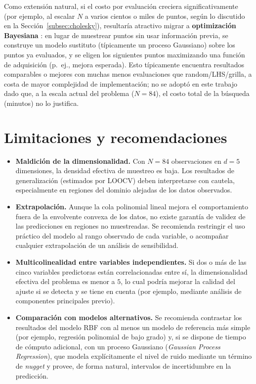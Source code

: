 \documentclass[11pt,a4paper]{article}
\begin{document}
Como extensi\'on natural, si el costo por evaluaci\'on creciera
significativamente (por ejemplo, al escalar $N$ a varios cientos o miles de
puntos, seg\'un lo discutido en la Secci\'on~\ref{subsec:cholesky}), resultar\'ia
atractivo migrar a \textbf{optimizaci\'on Bayesiana}
\cite{snoek2012}: en lugar de muestrear puntos sin usar informaci\'on previa,
se construye un modelo sustituto (t\'ipicamente un proceso Gaussiano) sobre los
puntos ya evaluados, y se eligen los siguientes puntos maximizando una
funci\'on de adquisici\'on (p.\ ej., mejora esperada). Esto t\'ipicamente
encuentra resultados comparables o mejores con muchas menos evaluaciones que
random/LHS/grilla, a costa de mayor complejidad de implementaci\'on; no se
adopt\'o en este trabajo dado que, a la escala actual del problema ($N=84$), el
costo total de la b\'usqueda (minutos) no lo justifica.

\section{Limitaciones y recomendaciones}

\begin{itemize}
    \item \textbf{Maldici\'on de la dimensionalidad.} Con $N=84$ observaciones
    en $d=5$ dimensiones, la densidad efectiva de muestreo es baja. Los
    resultados de generalizaci\'on (estimados por LOOCV) deben interpretarse
    con cautela, especialmente en regiones del dominio alejadas de los datos
    observados.

    \item \textbf{Extrapolaci\'on.} Aunque la cola polinomial lineal mejora el
    comportamiento fuera de la envolvente convexa de los datos, no existe
    garant\'ia de validez de las predicciones en regiones no muestreadas. Se
    recomienda restringir el uso pr\'actico del modelo al rango observado de
    cada variable, o acompa\~nar cualquier extrapolaci\'on de un an\'alisis de
    sensibilidad.

    \item \textbf{Multicolinealidad entre variables independientes.} Si dos o
    m\'as de las cinco variables predictoras est\'an correlacionadas entre
    s\'i, la dimensionalidad efectiva del problema es menor a $5$, lo cual
    podr\'ia mejorar la calidad del ajuste si se detecta y se tiene en cuenta
    (por ejemplo, mediante an\'alisis de componentes principales previo).

    \item \textbf{Comparaci\'on con modelos alternativos.} Se recomienda
    contrastar los resultados del modelo RBF con al menos un modelo de
    referencia m\'as simple (por ejemplo, regresi\'on polinomial de bajo
    grado) y, si se dispone de tiempo de c\'omputo adicional, con un proceso
    Gaussiano (\emph{Gaussian Process Regression}), que modela expl\'icitamente
    el nivel de ruido mediante un t\'ermino de \emph{nugget} y provee, de forma
    natural, intervalos de incertidumbre en la predicci\'on.
\end{itemize}
\end{document}
